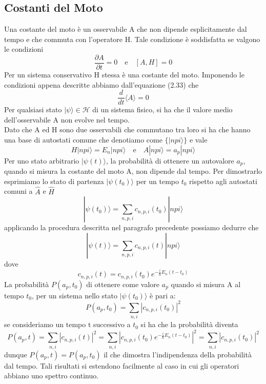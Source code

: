 \subsection{Costanti del Moto}

Una costante del moto \`e un osservabile A che non dipende esplicitamente dal tempo e che commuta con l'operatore H. Tale condizione \`e soddisfatta se valgono le condizioni 
\begin{equation*}
	\frac{\partial A}{ \partial t} = 0 \quad \text{e} \quad [A,H] = 0
\end{equation*} 
Per un sistema conservativo H stessa \`e una costante del moto. Imponendo le condizioni appena descritte abbiamo dall'equazione (2.33) che 
\begin{equation*}
	\frac{d}{dt}\langle A \rangle = 0
\end{equation*}
Per qualsiasi stato $|\psi \rangle \in \mathcal{H}$ di un sistema fisico, si ha che il valore medio dell'osservabile A non evolve nel tempo.
\\
Dato che A ed H sono due osservabili che commutano tra loro si ha che hanno una base di autostati comune 
che denotiamo come $\{|npi\rangle \}$ e vale
\begin{equation*}
	H|npi\rangle = E_n |npi\rangle \quad \text{e} \quad A|npi\rangle = a_p |npi\rangle 
\end{equation*}
Per uno stato arbitrario $|\psi(t)\rangle $, la probabilit\`a di ottenere un autovalore $a_p$, quando si misura la costante del moto A, non dipende dal tempo. Per dimostrarlo esprimiamo lo stato di partenza $|\psi(t_0) \rangle $ per un tempo $t_0$ rispetto agli autostati comuni a $\hat{A}$ e $\hat{H}$
\begin{equation*}
	|\psi(t_0) \rangle = \sum_{n,p,i} c_{n,p,i}(t_0)|npi\rangle 
\end{equation*} 
applicando la procedura descritta nel paragrafo precedente possiamo dedurre che 
\begin{equation*}
	|\psi(t) \rangle = \sum_{n,p,i}c_{n,p,i}(t)|npi \rangle 
\end{equation*}
dove 
\begin{equation*}
	c_{n,p,i}(t) = c_{n,p,i}(t_0)e^{-\frac{i}{\hbar}E_n (t-t_0)}
\end{equation*}
La probabilit\`a $P(a_p,t_0)$ di ottenere come valore $a_p$ quando si misura A al tempo $t_0$, per un sistema nello stato $|\psi(t_0)\rangle$ \`e pari a:
\begin{equation*}
	P(a_p,t_0) = \sum_{n,i}|c_{n,p,i}(t_0)|^2
\end{equation*}
se consideriamo un tempo t successivo a $t_0$ si ha che la probabilit\`a diventa
\begin{equation*}
	P(a_p,t) = \sum_{n,i}|c_{n,p,i}(t)|^2 =\sum_{n,i}|c_{n,p,i}(t_0)e^{-\frac{i}{\hbar}E_n (t-t_0)}|^2 =  \sum_{n,i}|c_{n,p,i}(t_0)|^2
\end{equation*} 
dunque $P(a_p,t) = P(a_p,t_0)$ il che dimostra l'indipendenza della probabilit\`a dal tempo.
Tali risultati si estendono facilmente al caso in cui gli operatori abbiano uno spettro continuo.

